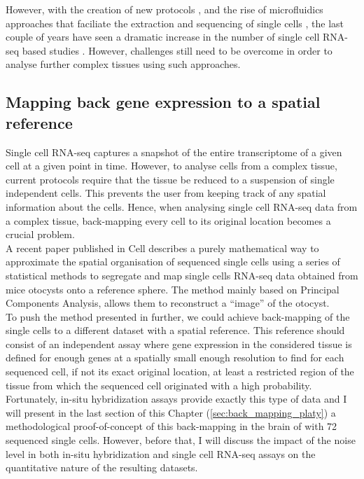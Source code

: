 	However, with the creation of new protocols \cite{ramskold12,tang09}, and the rise of microfluidics approaches that faciliate the extraction and sequencing of single cells \cite{ozsolak10}, the last couple of years have seen a dramatic increase in the number of single cell RNA-seq based studies \cite{islam13,marinov13,yan13,staahlberg13,deng14}. However, challenges still need to be overcome in order to analyse further complex tissues using such approaches.

  \subsection{Mapping back gene expression to a spatial reference}

	Single cell RNA-seq captures a snapshot of the entire transcriptome of a given cell at a given point in time. However, to analyse cells from a complex tissue, current protocols require that the tissue be reduced to a suspension of single independent cells. This prevents the user from keeping track of any spatial information about the cells. Hence, when analysing single cell RNA-seq data from a complex tissue, back-mapping every cell to its original location becomes a crucial problem.\\ 
	
	A recent paper published in Cell \cite{durruthy14} describes a purely mathematical way to approximate the spatial organisation of sequenced single cells using a series of statistical methods to segregate and map single cells RNA-seq data obtained from mice otocysts onto a reference sphere. The method mainly based on Principal Components Analysis, allows them to reconstruct a ``image'' of the otocyst.\\
	
	To push the method presented in \cite{durruthy14} further, we could achieve back-mapping of the single cells to a different dataset with a spatial reference. This reference should consist of an independent assay where gene expression in the considered tissue is defined for enough genes at a spatially small enough resolution to find for each sequenced cell, if not its exact original location, at least a restricted region of the tissue from which the sequenced cell originated with a high probability.\\
	
	Fortunately, in-situ hybridization assays provide exactly this type of data and I will present in the last section of this Chapter (\ref{sec:back_mapping_platy}) a methodological proof-of-concept of this back-mapping in the brain of \platy{} with 72 sequenced single cells. However, before that, I will discuss the impact of the noise level in both in-situ hybridization and single cell RNA-seq assays on the quantitative nature of the resulting datasets.

